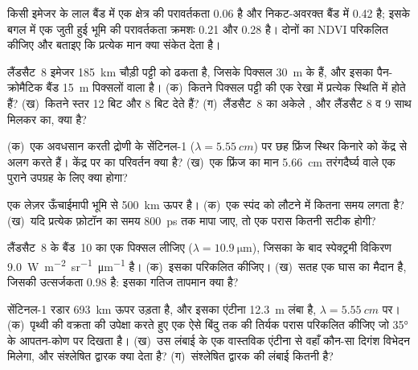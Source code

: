 \begin{exercise}[$\star$]\label{exo:b3:remote-sensing-gis:1}
किसी इमेजर के लाल बैंड में एक क्षेत्र की परावर्तकता 0.06 है और
निकट-अवरक्त बैंड में 0.42 है; इसके बगल में एक जुती हुई भूमि की परावर्तकता क्रमशः 0.21 और
0.28 है। दोनों का NDVI परिकलित कीजिए और बताइए कि प्रत्येक मान क्या संकेत देता है।
\end{exercise}

\begin{exercise}[$\star$]\label{exo:b3:remote-sensing-gis:2}
लैंडसैट~8 इमेजर \qty{185}{km} चौड़ी पट्टी को ढकता है, जिसके पिक्सल
\qty{30}{m} के हैं, और इसका पैन-क्रोमैटिक बैंड \qty{15}{m} पिक्सलों वाला है। (क)~कितने
पिक्सल पट्टी की एक रेखा में प्रत्येक स्थिति में होते हैं? (ख)~कितने स्तर
12 बिट और 8 बिट देते हैं? (ग)~लैंडसैट~8 का
अकेले , और लैंडसैट 8 व 9 साथ मिलकर का, क्या है?
\end{exercise}

\begin{exercise}[$\star$]\label{exo:b3:remote-sensing-gis:3}
(क)~एक अवधसान करती द्रोणी के सेंटिनल-1  ($\lambda = \qty{5.55}{cm}$) पर
छह फ्रिंज स्थिर किनारे को केंद्र से अलग करते हैं।
केंद्र पर  का परिवर्तन क्या है? (ख)~एक फ्रिंज का मान
\qty{5.66}{cm} तरंगदैर्घ्य वाले एक पुराने उपग्रह के लिए क्या होगा?
\end{exercise}

\begin{exercise}[$\star$]\label{exo:b3:remote-sensing-gis:4}
एक लेज़र ऊँचाईमापी भूमि से \qty{500}{km} ऊपर है। (क)~एक स्पंद को
लौटने में कितना समय लगता है? (ख)~यदि प्रत्येक फ़ोटॉन का समय \qty{800}{ps} तक मापा जाए, तो
एक परास कितनी सटीक होगी?
\end{exercise}

\begin{exercise}[$\star\star$]\label{exo:b3:remote-sensing-gis:5}
लैंडसैट~8 के बैंड~10 का एक पिक्सल लीजिए ($\lambda = \qty{10.9}{\micro\metre}$),
जिसका  के बाद स्पेक्ट्रमी विकिरण
\qty{9.0}{W.m^{-2}.sr^{-1}.\micro\metre^{-1}} है। (क)~इसका  परिकलित कीजिए। (ख)~सतह एक घास का मैदान है, जिसकी उत्सर्जकता 0.98 है: इसका
गतिज तापमान क्या है?
\end{exercise}

\begin{exercise}[$\star\star$]\label{exo:b3:remote-sensing-gis:6}
सेंटिनल-1 रडार \qty{693}{km} ऊपर उड़ता है, और इसका एंटीना \qty{12.3}{m}
लंबा है, $\lambda = \qty{5.55}{cm}$ पर। (क)~पृथ्वी की वक्रता की उपेक्षा करते हुए
एक ऐसे बिंदु तक की तिर्यक परास परिकलित कीजिए जो
\ang{35} के आपतन-कोण पर दिखता है। (ख)~उस लंबाई के एक वास्तविक एंटीना से वहाँ
कौन-सा दिगंश विभेदन मिलेगा, और संश्लेषित द्वारक क्या देता है? (ग)~संश्लेषित द्वारक
की लंबाई कितनी है?
\end{exercise}

